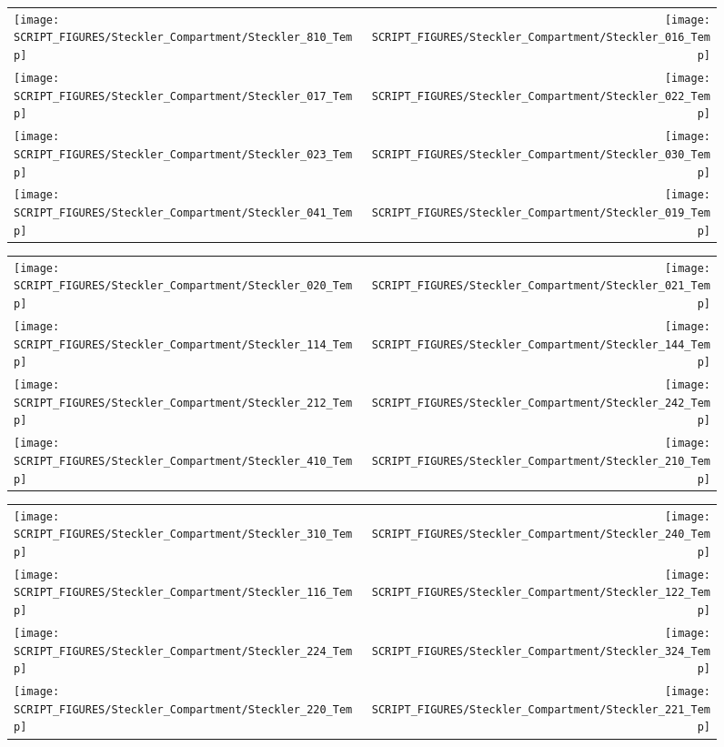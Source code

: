 \begin{figure}[p]
\begin{tabular*}{\textwidth}{l@{\extracolsep{\fill}}r}
\texttt{[image: SCRIPT\_FIGURES/Steckler\_Compartment/Steckler\_810\_Temp]} &
\texttt{[image: SCRIPT\_FIGURES/Steckler\_Compartment/Steckler\_016\_Temp]} \\
\texttt{[image: SCRIPT\_FIGURES/Steckler\_Compartment/Steckler\_017\_Temp]} &
\texttt{[image: SCRIPT\_FIGURES/Steckler\_Compartment/Steckler\_022\_Temp]} \\
\texttt{[image: SCRIPT\_FIGURES/Steckler\_Compartment/Steckler\_023\_Temp]} &
\texttt{[image: SCRIPT\_FIGURES/Steckler\_Compartment/Steckler\_030\_Temp]} \\
\texttt{[image: SCRIPT\_FIGURES/Steckler\_Compartment/Steckler\_041\_Temp]} &
\texttt{[image: SCRIPT\_FIGURES/Steckler\_Compartment/Steckler\_019\_Temp]}
\end{tabular*}
\end{figure}

\begin{figure}[p]
\begin{tabular*}{\textwidth}{l@{\extracolsep{\fill}}r}
\texttt{[image: SCRIPT\_FIGURES/Steckler\_Compartment/Steckler\_020\_Temp]} &
\texttt{[image: SCRIPT\_FIGURES/Steckler\_Compartment/Steckler\_021\_Temp]} \\
\texttt{[image: SCRIPT\_FIGURES/Steckler\_Compartment/Steckler\_114\_Temp]} &
\texttt{[image: SCRIPT\_FIGURES/Steckler\_Compartment/Steckler\_144\_Temp]} \\
\texttt{[image: SCRIPT\_FIGURES/Steckler\_Compartment/Steckler\_212\_Temp]} &
\texttt{[image: SCRIPT\_FIGURES/Steckler\_Compartment/Steckler\_242\_Temp]} \\
\texttt{[image: SCRIPT\_FIGURES/Steckler\_Compartment/Steckler\_410\_Temp]} &
\texttt{[image: SCRIPT\_FIGURES/Steckler\_Compartment/Steckler\_210\_Temp]}
\end{tabular*}
\end{figure}

\begin{figure}[p]
\begin{tabular*}{\textwidth}{l@{\extracolsep{\fill}}r}
\texttt{[image: SCRIPT\_FIGURES/Steckler\_Compartment/Steckler\_310\_Temp]} &
\texttt{[image: SCRIPT\_FIGURES/Steckler\_Compartment/Steckler\_240\_Temp]} \\
\texttt{[image: SCRIPT\_FIGURES/Steckler\_Compartment/Steckler\_116\_Temp]} &
\texttt{[image: SCRIPT\_FIGURES/Steckler\_Compartment/Steckler\_122\_Temp]} \\
\texttt{[image: SCRIPT\_FIGURES/Steckler\_Compartment/Steckler\_224\_Temp]} &
\texttt{[image: SCRIPT\_FIGURES/Steckler\_Compartment/Steckler\_324\_Temp]} \\
\texttt{[image: SCRIPT\_FIGURES/Steckler\_Compartment/Steckler\_220\_Temp]} &
\texttt{[image: SCRIPT\_FIGURES/Steckler\_Compartment/Steckler\_221\_Temp]}
\end{tabular*}
\end{figure}

